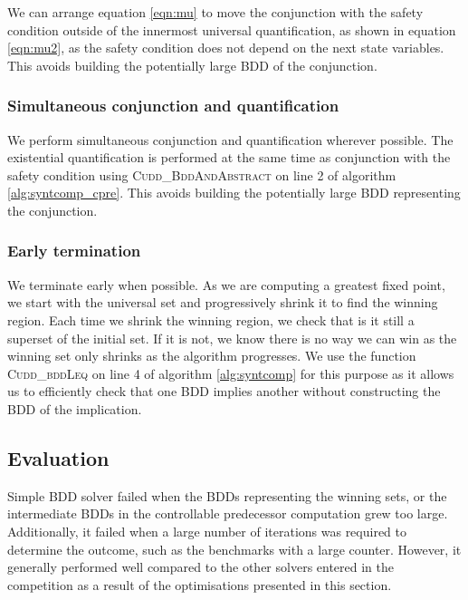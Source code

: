 We can arrange equation \ref{eqn:mu} to move the conjunction with the safety condition outside of the innermost universal quantification, as shown in equation \ref{eqn:mu2}, as the safety condition does not depend on the next state variables. This avoids building the potentially large BDD of the conjunction.

\subsubsection{Simultaneous conjunction and quantification}
We perform simultaneous conjunction and quantification wherever possible. The existential quantification is performed at the same time as conjunction with the safety condition using \textsc{Cudd\_BddAndAbstract} on line 2 of algorithm \ref{alg:syntcomp_cpre}. This avoids building the potentially large BDD representing the conjunction.

\subsubsection{Early termination}
We terminate early when possible. As we are computing a greatest fixed point, we start with the universal set and progressively shrink it to find the winning region. Each time we shrink the winning region, we check that is it still a superset of the initial set. If it is not, we know there is no way we can win as the winning set only shrinks as the algorithm progresses. We use the function \textsc{Cudd\_bddLeq} on line 4 of algorithm \ref{alg:syntcomp} for this purpose as it allows us to efficiently check that one BDD implies another without constructing the BDD of the implication.

\subsection{Evaluation}
Simple BDD solver failed when the BDDs representing the winning sets, or the intermediate BDDs in the controllable predecessor computation grew too large. Additionally, it failed when a large number of iterations was required to determine the outcome, such as the benchmarks with a large counter. However, it generally performed well compared to the other solvers entered in the competition as a result of the optimisations presented in this section.

